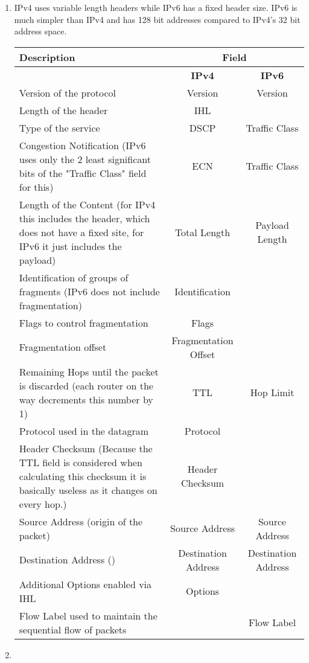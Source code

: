 \documentclass[12pt, a4paper]{article}
\begin{document}
\section{} %
\begin{enumerate}[1]
	\item %
	IPv4 uses variable length headers while IPv6 has a fixed header size. IPv6 is much simpler than IPv4 and has 128 bit addresses compared to IPv4's 32 bit address space.

	\begin{tabular}{|p{18em}|c|c|}
		\hline
		\textbf{Description} & \multicolumn{2}{|c|}{\textbf{Field}}\\\hline
		& \textbf{IPv4} & \textbf{IPv6}\\\hline
		Version of the protocol & Version & Version\\\hline
		Length of the header & IHL &\\\hline
		Type of the service & DSCP & Traffic Class\\\hline
		Congestion Notification (IPv6 uses only the 2 least significant bits of the "Traffic Class" field for this) & ECN & Traffic Class\\\hline
		Length of the Content (for IPv4 this includes the header, which does not have a fixed site, for IPv6 it just includes the payload) & Total Length & Payload Length\\\hline
		Identification of groups of fragments (IPv6 does not include fragmentation) & Identification &\\\hline
		Flags to control fragmentation & Flags &\\\hline
		Fragmentation offset & Fragmentation Offset &\\\hline
		Remaining Hops until the packet is discarded (each router on the way decrements this number by 1) & TTL & Hop Limit\\\hline
		Protocol used in the datagram & Protocol &\\\hline
		Header Checksum (Because the TTL field is considered when calculating this checksum it is basically useless as it changes on every hop.) & Header Checksum &\\\hline
		Source Address (origin of the packet) & Source Address & Source Address\\\hline
		Destination Address () & Destination Address & Destination Address\\\hline
		Additional Options enabled via IHL & Options &\\\hline
		Flow Label used to maintain the sequential flow of packets && Flow Label\\\hline
	\end{tabular}

	\item %
\end{enumerate}
\end{document}
